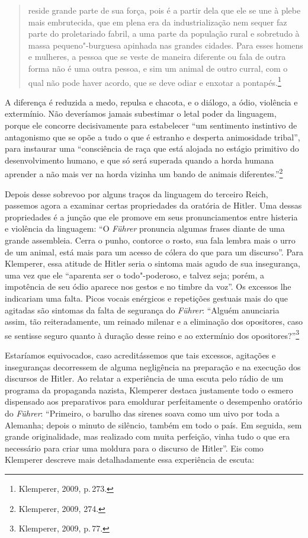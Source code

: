 \begin{quote}
reside grande parte de sua força, pois é a partir dela que ele se une à
plebe mais embrutecida, que em plena era da industrialização nem sequer
faz parte do proletariado fabril, a uma parte da população rural e
sobretudo à massa pequeno"-burguesa apinhada nas grandes cidades. Para
esses homens e mulheres, a pessoa que se veste de maneira diferente ou
fala de outra forma não é uma outra pessoa, e sim um animal de outro
curral, com o qual não pode haver acordo, que se deve odiar e enxotar a
pontapés.\footnote{Klemperer, 2009, p.\,273.}
\end{quote}

A diferença é reduzida a medo, repulsa e chacota, e o diálogo, a ódio,
violência e extermínio. Não deveríamos jamais subestimar o letal poder
da linguagem, porque ele concorre decisivamente para estabelecer ``um
sentimento instintivo de antagonismo que se opõe a tudo o que é estranho
e desperta animosidade tribal'', para instaurar uma ``consciência de
raça que está alojada no estágio primitivo do desenvolvimento humano, e
que só será superada quando a horda humana aprender a não mais ver na
horda vizinha um bando de animais diferentes.''\footnote{Klemperer,
  2009, 274.}

Depois desse sobrevoo por alguns traços da linguagem do terceiro Reich,
passemos agora a examinar certas propriedades da oratória de Hitler. Uma
dessas propriedades é a junção que ele promove em seus pronunciamentos
entre histeria e violência da linguagem: ``O \emph{Führer} pronuncia
algumas frases diante de uma grande assembleia. Cerra o punho, contorce
o rosto, sua fala lembra mais o urro de um animal, está mais para um
acesso de cólera do que para um discurso''. Para Klemperer, essa atitude
de Hitler seria o sintoma mais agudo de sua insegurança, uma vez que ele
``aparenta ser o todo"-poderoso, e talvez seja; porém, a impotência de
seu ódio aparece nos gestos e no timbre da voz''. Os excessos lhe
indicariam uma falta. Picos vocais enérgicos e repetições gestuais mais
do que agitadas são sintomas da falta de segurança do \emph{Führer}:
``Alguém anunciaria assim, tão reiteradamente, um reinado milenar e a
eliminação dos opositores, caso se sentisse seguro quanto à duração
desse reino e ao extermínio dos opositores?''\footnote{Klemperer, 2009,
  p.\,77.}

Estaríamos equivocados, caso acreditássemos que tais excessos, agitações
e inseguranças decorressem de alguma negligência na preparação e na
execução dos discursos de Hitler. Ao relatar a experiência de uma escuta
pelo rádio de um programa da propaganda nazista, Klemperer destaca
justamente todo o esmero dispensado aos preparativos para emoldurar
perfeitamente o desempenho oratório do \emph{Führer}: ``Primeiro, o
barulho das sirenes soava como um uivo por toda a Alemanha; depois o
minuto de silêncio, também em todo o país. Em seguida, sem grande
originalidade, mas realizado com muita perfeição, vinha tudo o que era
necessário para criar uma moldura para o discurso de Hitler''. Eis como
Klemperer descreve mais detalhadamente essa experiência de escuta:

